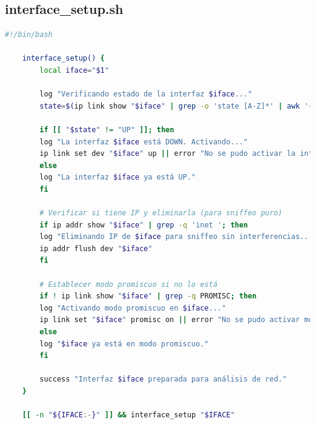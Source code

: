 \documentclass[11pt,a4paper,twoside]{report}
\begin{document}
\subsection*{interface\_setup.sh}
\begin{lstlisting}[language=bash, caption={interface\_setup.sh}, label={lst:interface-setup}]
	#!/bin/bash
	
	interface_setup() {
		local iface="$1"
		
		log "Verificando estado de la interfaz $iface..."
		state=$(ip link show "$iface" | grep -o 'state [A-Z]*' | awk '{print $2}')
		
		if [[ "$state" != "UP" ]]; then
		log "La interfaz $iface está DOWN. Activando..."
		ip link set dev "$iface" up || error "No se pudo activar la interfaz $iface."
		else
		log "La interfaz $iface ya está UP."
		fi
		
		# Verificar si tiene IP y eliminarla (para sniffeo puro)
		if ip addr show "$iface" | grep -q 'inet '; then
		log "Eliminando IP de $iface para sniffeo sin interferencias..."
		ip addr flush dev "$iface"
		fi
		
		# Establecer modo promiscuo si no lo está
		if ! ip link show "$iface" | grep -q PROMISC; then
		log "Activando modo promiscuo en $iface..."
		ip link set "$iface" promisc on || error "No se pudo activar modo promiscuo en $iface."
		else
		log "$iface ya está en modo promiscuo."
		fi
		
		success "Interfaz $iface preparada para análisis de red."
	}
	
	[[ -n "${IFACE:-}" ]] && interface_setup "$IFACE"
\end{lstlisting}
\end{document}
